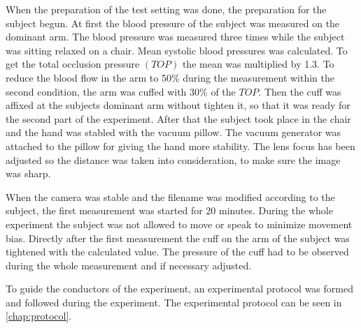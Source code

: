 When the preparation of the test setting was done, the preparation for the subject begun. At first the blood pressure of the subject was measured on the dominant arm. The blood pressure was measured three times while the subject was sitting relaxed on a chair. Mean systolic blood pressures was calculated. To get the total occlusion pressure $(TOP)$ the mean was multiplied by 1.3. To reduce the blood flow in the arm to 50\% during the measurement within the second condition, the arm was cuffed with 30\% of the $TOP$.\cite{mouser2017} 
Then the cuff was affixed at the subjects dominant arm without tighten it, so that it was ready for the second part of the experiment. After that the subject took place in the chair and the hand was stabled with the vacuum pillow. The vacuum generator was attached to the pillow for giving the hand more stability. The lens focus has been adjusted so the distance was taken into consideration, to make sure the image was sharp.

When the camera was stable and the filename was modified according to the subject, the first measurement was started for 20 minutes. During the whole experiment the subject was not allowed to move or speak to minimize movement bias.
Directly after the first measurement the cuff on the arm of the subject was tightened with the calculated value. The pressure of the cuff had to be observed during the whole measurement and if necessary adjusted.

To guide the conductors of the experiment, an experimental protocol was formed and followed during the experiment. The experimental protocol can be seen in \cref{chap:protocol}. 


